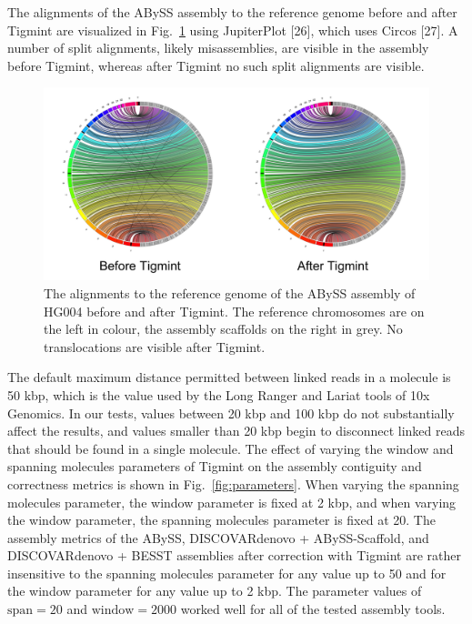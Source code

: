 \documentclass{bmcart}
\begin{document}
The alignments of the ABySS assembly to the reference genome before and after Tigmint are visualized in Fig.~\ref{fig:jupiter} using JupiterPlot {[}26{]}, which uses Circos {[}27{]}. A number of split alignments, likely misassemblies, are visible in the assembly before Tigmint, whereas after Tigmint no such split alignments are visible.

\begin{figure}[!htbp]
\hypertarget{fig:jupiter}{%
\centering
\includegraphics[width=4.8in]{figures/jupiter.png}
\caption{The alignments to the reference genome of the ABySS assembly of HG004 before and after Tigmint. The reference chromosomes are on the left in colour, the assembly scaffolds on the right in grey. No translocations are visible after Tigmint.}\label{fig:jupiter}
}
\end{figure}

The default maximum distance permitted between linked reads in a molecule is 50 kbp, which is the value used by the Long Ranger and Lariat tools of 10x Genomics. In our tests, values between 20 kbp and 100 kbp do not substantially affect the results, and values smaller than 20 kbp begin to disconnect linked reads that should be found in a single molecule. The effect of varying the window and spanning molecules parameters of Tigmint on the assembly contiguity and correctness metrics is shown in Fig.~\ref{fig:parameters}. When varying the spanning molecules parameter, the window parameter is fixed at 2 kbp, and when varying the window parameter, the spanning molecules parameter is fixed at 20. The assembly metrics of the ABySS, DISCOVARdenovo + ABySS-Scaffold, and DISCOVARdenovo + BESST assemblies after correction with Tigmint are rather insensitive to the spanning molecules parameter for any value up to 50 and for the window parameter for any value up to 2 kbp. The parameter values of \(\textrm{span} = 20\) and \(\textrm{window} = 2000\) worked well for all of the tested assembly tools.
\end{document}
